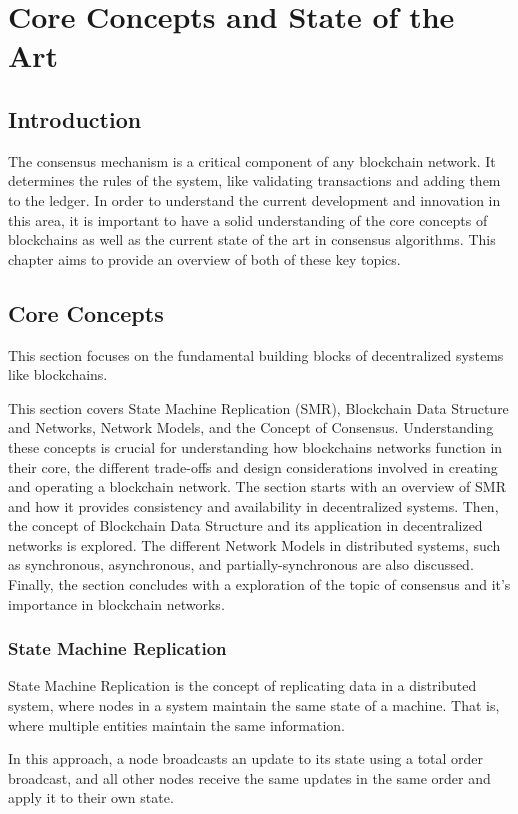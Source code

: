 \chapter{Core Concepts and State of the Art}

\section{Introduction}
The consensus mechanism is a critical component of any blockchain network. It determines the rules of the system, like validating transactions and adding them to the ledger. In order to understand the current development and innovation in this area, it is important to have a solid understanding of the core concepts of blockchains as well as the current state of the art in consensus algorithms. This chapter aims to provide an overview of both of these key topics.

\section{Core Concepts}
This section focuses on the fundamental building blocks of decentralized systems like block\-chains.

This section covers State Machine Replication (SMR), Blockchain Data Structure and Networks, Network Models, and the Concept of Consensus.
Understanding these concepts is crucial for understanding how blockchains networks function in their core, the different trade-offs and design considerations involved in creating and operating a blockchain network. The section starts with an overview of SMR and how it provides consistency and availability in decentralized systems.
Then, the concept of Blockchain Data Structure and its application in decentralized networks is explored. The different Network Models in distributed systems, such as synchronous, asynchronous, and partially-synchronous are also discussed. Finally, the section concludes with a exploration of the topic of consensus and it's importance in blockchain networks.


\subsection*{\textbf{State Machine Replication}}
State Machine Replication is the concept of replicating data in a distributed system, where nodes in a system maintain the same state of a machine. That is, where multiple entities maintain the same information.

In this approach, a node broadcasts an update to its state using a total order broadcast, and all other nodes receive the same updates in the same order and apply it to their own state.

